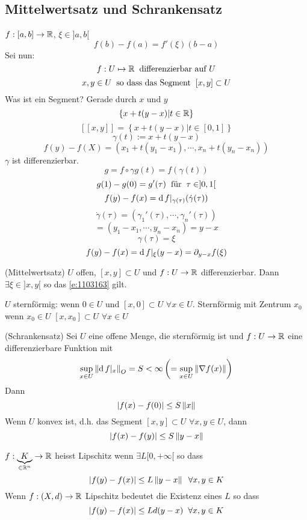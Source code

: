 \subsection{Mittelwertsatz und Schrankensatz}
  $f:[a,b]\rightarrow\mathbb{R}$, $\xi\in ]a,b[$
  \[f(b)-f(a)=f'(\xi)(b-a)\]
  Sei nun:
  \[f:U\mapsto\mathbb{R}\hspace{2mm}\text{differenzierbar auf $U$}\]
  \[x,y\in U\hspace{2mm}\text{so dass das Segment}\hspace{2mm}[x,y]\subset U\]
  Was ist ein Segment? Gerade durch $x$ und $y$
  \[\left\{ x+t(y-x)|t\in \mathbb{R} \right\}\]
  \[\left[ [x,y] \right]=\left\{ x+t(y-x)|t\in \left[ 0,1 \right] \right\}\]
  \[\gamma(t):= x+t(y-x)\]
  \[f(y)-f(X)=\left( x_1+t(y_1-x_1),\cdots,x_n+t(y_n-x_n) \right)\]
  $\gamma$ ist differenzierbar.
  \[g=f\circ \gamma g(t)=f(\gamma(t))\]
  \[g(1)-g(0)=g'(\tau)\hspace{2mm}\text{für}\hspace{2mm} \tau\in ]0,1[\]
  \[f(y)-f(x)=\operatorname{d} f|_{\gamma(\tau)}(\dot\gamma(\tau))\]
  \[\dot\gamma(\tau)=(\gamma_1'(\tau),\cdots,\gamma_n'(\tau))\]
  \[=(y_1-x_1,\cdots,y_n-x_n)=y-x\]
  \[\gamma(\tau)=\xi\]
  \begin{equation}
    \label{e:1103163}
    f(y)-f(x)=\operatorname{d} f|_\xi(y-x)=\partial_{y-x}f(\xi)
  \end{equation}
\begin{Sat}
  (Mittelwertsatz) $U$ offen, $[x,y]\subset U$ und $f:U\rightarrow\mathbb{R}$ differenzierbar. Dann $\exists \xi\in ]x,y[$ so das \ref{e:1103163} gilt.
\end{Sat}
\begin{Def}
  $U$ sternförmig: wenn $0\in U$ und $[x,0]\subset U$ $\forall x\in U$. Sternförmig mit Zentrum $x_0$ wenn $x_0\in U$ $[x,x_0]\subset U$ $\forall x\in U$
\end{Def}
\begin{Sat}
  (Schrankensatz) Sei $U$ eine offene Menge, die sternförmig ist und $f:U\rightarrow\mathbb{R}$ eine differenzierbare Funktion mit
  \[\sup_{x\in U}\left\| \operatorname{d} f|_x \right\|_{O}=S<\infty \left( =\sup_{x\in U}\left\| \nabla f(x) \right\| \right)\]
  Dann
  \[\left| f(x)-f(0) \right|\leq S\left\| x \right\|\]
  Wenn $U$ konvex ist, d.h. das Segment $[x,y]\subset U$ $\forall x,y\in U$, dann
  \[\left| f(x)-f(y) \right|\leq S\left\| y-x \right\|\]
\end{Sat}
\begin{Def}
  $f:\underbrace{K}_{\in \mathbb{R}^n}\rightarrow\mathbb{R}$ heisst Lipschitz wenn $\exists L[0,+\infty[$ so dass
  \[\left| f(y)-f(x) \right|\leq L\left\| y-x \right\|\hspace{2mm}\forall x,y\in K\]
  Wenn $f:(X,d)\rightarrow\mathbb{R}$ Lipschitz bedeutet die Existenz eines $L$ so dass
  \[\left| f(y)-f(x) \right|\leq L d(y-x)\hspace{2mm}\forall x,y\in K\]
\end{Def}
